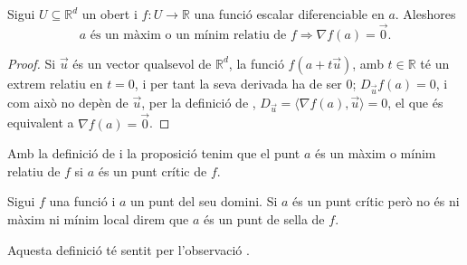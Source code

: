 \documentclass[../Apunts.tex]{subfiles}
\begin{document}
	\begin{proposition}\label{prop:Identificació d'extrems relatius}
		Sigui \(U\subseteq\mathbb{R}^{d}\) un obert i \(f\colon U\to\mathbb{R}\) una funció escalar diferenciable en \(a\). Aleshores
		\[a\text{ és un màxim o un mínim relatiu de }f\Longrightarrow \nabla f(a)=\vec{0}.\]
		\begin{proof}
			Si \(\vec{u}\) és un vector qualsevol de \(\mathbb{R}^{d}\), la funció \(f(a+t\vec{u})\), amb \(t\in\mathbb{R}\) té un extrem relatiu en \(t=0\), i per tant la seva derivada ha de ser 0; \(D_{\vec{u}}f(a)=0\), i com això no depèn de \(\vec{u}\), per la definició de , \(D_{\vec{u}}=\langle\nabla f(a),\vec{u}\rangle=0\), el que és equivalent a \(\nabla f(a)=\vec{0}\).
		\end{proof}
	\end{proposition}
	\begin{observation}\label{obs:extrem relatiu és punt crític}
		Amb la definició de  i la proposició  tenim que el punt \(a\) és un màxim o mínim relatiu de \(f\) si \(a\) és un punt crític de \(f\).
	\end{observation}
	\begin{definition}
		\label{def:punt de sella}
		Sigui \(f\) una funció i \(a\) un punt del seu domini. Si \(a\) és un punt crític però no és ni màxim ni mínim local direm que \(a\) és un punt de sella de \(f\).
		
		Aquesta definició té sentit per l'observació .
	\end{definition}
\end{document}
